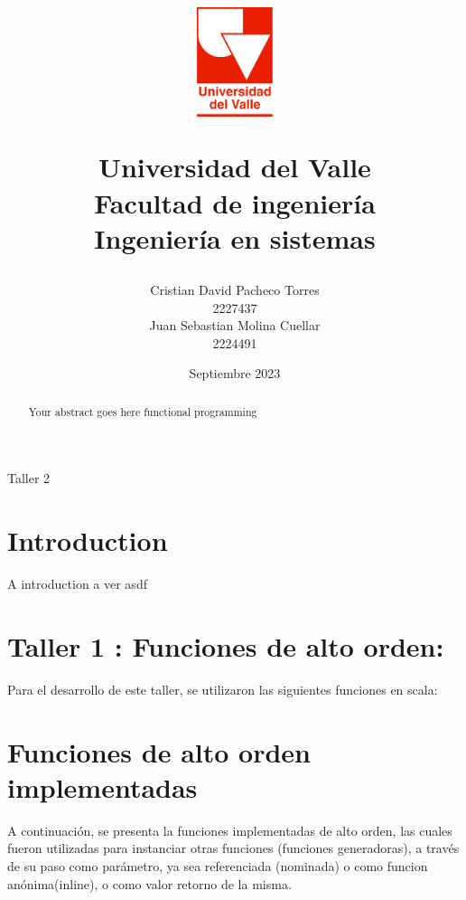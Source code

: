 \documentclass[12pt, a4paper]{article}
\title{
  \begin{figure}[th]
    \centering
    \includegraphics[width=0.2\textwidth]{Univalle}
  \end{figure}
  \textbf{Universidad del Valle
    \\{\Large Facultad de ingeniería}
  \\{\large Ingeniería en sistemas}}}
\author{Cristian David Pacheco Torres
  \\ 2227437
  \\ Juan Sebastian Molina Cuellar
  \\ 2224491}
\date{Septiembre 2023}
\begin{document}
\maketitle
Taller 2
\newpage{}
\begin{abstract}
Your abstract goes here functional programming
\end{abstract}
\newpage{}
\tableofcontents
\newpage{}
\section{Introduction}
A introduction a ver asdf 
\section{Taller 1 : Funciones de alto orden:}
Para el desarrollo de este taller, se utilizaron las siguientes funciones en scala: \\

\section{Funciones de alto orden implementadas}

A continuación, se presenta la funciones implementadas de alto orden, las cuales fueron utilizadas para instanciar otras funciones (funciones generadoras), a través de su paso como parámetro, ya sea referenciada (nominada) o como funcion anónima(inline), o como valor retorno de la misma. \\[16pt]
\end{document}
